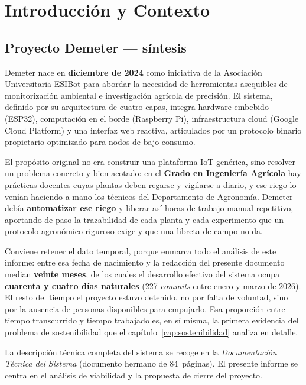 \chapter{Introducci\'on y Contexto}
\label{cap:introduccion}

\section{Proyecto Demeter --- s\'intesis}

Demeter nace en \textbf{diciembre de 2024} como iniciativa de la
Asociaci\'on Universitaria ESIBot para abordar la necesidad de
herramientas asequibles de monitorizaci\'on ambiental e investigaci\'on
agr\'icola de precisi\'on. El sistema, definido por su arquitectura de
cuatro capas, integra hardware embebido (ESP32), computaci\'on en el
borde (Raspberry Pi), infraestructura cloud (Google Cloud Platform) y
una interfaz web reactiva, articulados por un protocolo binario
propietario optimizado para nodos de bajo consumo.

El prop\'osito original no era construir una plataforma IoT gen\'erica,
sino resolver un problema concreto y bien acotado: en el
\textbf{Grado en Ingenier\'ia Agr\'icola} hay pr\'acticas docentes cuyas
plantas deben regarse y vigilarse a diario, y ese riego lo ven\'ian
haciendo a mano los t\'ecnicos del Departamento de Agronom\'ia. Demeter
deb\'ia \textbf{automatizar ese riego} y liberar as\'i horas de trabajo
manual repetitivo, aportando de paso la trazabilidad de cada planta y
cada experimento que un protocolo agron\'omico riguroso exige y que una
libreta de campo no da.

Conviene retener el dato temporal, porque enmarca todo el an\'alisis de
este informe: entre esa fecha de nacimiento y la redacci\'on del presente
documento median \textbf{veinte meses}, de los cuales el desarrollo
efectivo del sistema ocupa \textbf{cuarenta y cuatro d\'ias naturales}
(227 \textit{commits} entre enero y marzo de 2026). El resto del tiempo
el proyecto estuvo detenido, no por falta de voluntad, sino por la
ausencia de personas disponibles para empujarlo. Esa proporci\'on entre
tiempo transcurrido y tiempo trabajado es, en s\'i misma, la primera
evidencia del problema de sostenibilidad que el
cap\'itulo~\ref{cap:sostenibilidad} analiza en detalle.

La descripci\'on t\'ecnica completa del sistema se recoge en la
\textit{Documentaci\'on T\'ecnica del Sistema} (documento hermano de
84~p\'aginas). El presente informe se centra en el an\'alisis de
viabilidad y la propuesta de cierre del proyecto.


